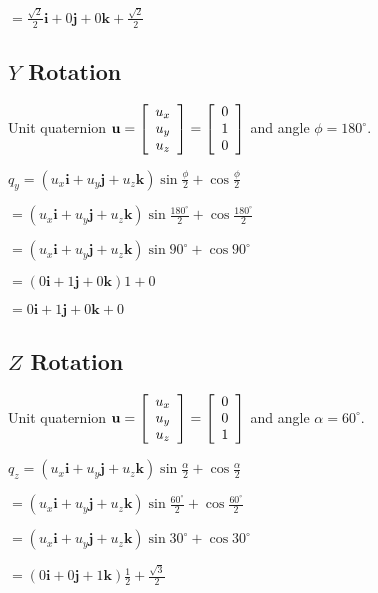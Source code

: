 \documentclass[11pt]{article}
\begin{document}
\begin{spacing}{1.2}
 $ =  \frac{\sqrt2}{2}\mathbf{i} + 0\mathbf{j} + 0\mathbf{k}  + \frac{\sqrt2}{2}$

    
\subsection{$Y$ Rotation}

Unit quaternion 
$\displaystyle 
\mathbf{u} = 
\left[
	\begin{array}{c}
		u_x \cr u_y \cr u_z \cr
	\end{array}
\right]
= 
\left[
	\begin{array}{c}
		0 \cr 1 \cr 0 \cr
	\end{array}
\right]
$
and angle $\phi = 180^{\circ}$.

$q_y
 = (u_x \mathbf{i} + u_y \mathbf{j} + u_z \mathbf{k}) \sin \frac{\phi}{2} + \cos \frac{\phi}{2}
 $
 
 $ = (u_x \mathbf{i} + u_y \mathbf{j} + u_z \mathbf{k}) \sin \frac{180^{\circ}}{2} + \cos \frac{180^{\circ}}{2}$

 $ = (u_x \mathbf{i} + u_y \mathbf{j} + u_z \mathbf{k}) \sin 90^{\circ} + \cos 90^{\circ}$

 $ = (0 \mathbf{i} + 1\mathbf{j} + 0\mathbf{k}) 1 + 0$

 $ = 0 \mathbf{i} + 1\mathbf{j} + 0\mathbf{k} + 0$

\subsection{$Z$ Rotation}

Unit quaternion 
$\displaystyle 
\mathbf{u} = 
\left[
	\begin{array}{c}
		u_x \cr u_y \cr u_z \cr
	\end{array}
\right]
= 
\left[
	\begin{array}{c}
		0 \cr 0 \cr 1 \cr
	\end{array}
\right]
$
and angle $\alpha = 60^{\circ}$.

$q_z
 = (u_x \mathbf{i} + u_y \mathbf{j} + u_z \mathbf{k}) \sin \frac{\alpha}{2} + \cos \frac{\alpha}{2}
 $
 
 $ = (u_x \mathbf{i} + u_y \mathbf{j} + u_z \mathbf{k}) \sin \frac{60^{\circ}}{2} + \cos \frac{60^{\circ}}{2}$

 $ = (u_x \mathbf{i} + u_y \mathbf{j} + u_z \mathbf{k}) \sin 30^{\circ} + \cos 30^{\circ}$

 $ = (0 \mathbf{i} + 0\mathbf{j} + 1\mathbf{k}) \frac{1}{2} + \frac{\sqrt3}{2}$


\end{spacing}
\end{document}
